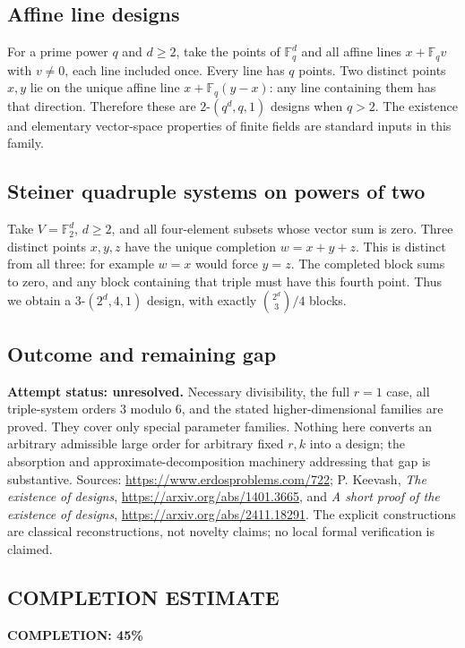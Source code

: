 \subsection*{Affine line designs}
For a prime power $q$ and $d\geq2$, take the points of $\mathbb F_q^d$ and all affine lines $x+\mathbb F_qv$ with $v\ne0$, each line included once. Every line has $q$ points. Two distinct points $x,y$ lie on the unique affine line $x+\mathbb F_q(y-x)$: any line containing them has that direction. Therefore these are $2$-$(q^d,q,1)$ designs when $q>2$.
The existence and elementary vector-space properties of finite fields are standard inputs in this family.

\subsection*{Steiner quadruple systems on powers of two}
Take $V=\mathbb F_2^d$, $d\geq2$, and all four-element subsets whose vector sum is zero. Three distinct points $x,y,z$ have the unique completion $w=x+y+z$. This is distinct from all three: for example $w=x$ would force $y=z$. The completed block sums to zero, and any block containing that triple must have this fourth point. Thus we obtain a $3$-$(2^d,4,1)$ design, with exactly $\binom{2^d}{3}/4$ blocks.

\subsection*{Outcome and remaining gap}
\textbf{Attempt status: unresolved.} Necessary divisibility, the full $r=1$ case, all triple-system orders $3$ modulo $6$, and the stated higher-dimensional families are proved. They cover only special parameter families. Nothing here converts an arbitrary admissible large order for arbitrary fixed $r,k$ into a design; the absorption and approximate-decomposition machinery addressing that gap is substantive.
Sources: \url{https://www.erdosproblems.com/722}; P. Keevash, \emph{The existence of designs}, \url{https://arxiv.org/abs/1401.3665}, and \emph{A short proof of the existence of designs}, \url{https://arxiv.org/abs/2411.18291}. The explicit constructions are classical reconstructions, not novelty claims; no local formal verification is claimed.

\subsection*{COMPLETION ESTIMATE}
\textbf{COMPLETION: 45\%}
